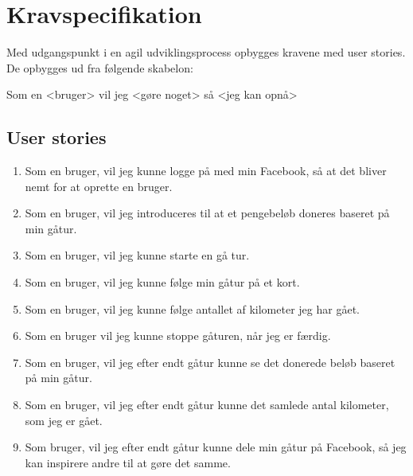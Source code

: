 \thispagestyle{fancy}
\chapter{Kravspecifikation}
\label{chp:description}

Med udgangspunkt i en agil udviklingsprocess opbygges kravene med user stories. De opbygges ud fra følgende skabelon: \\

\centerline{Som en <bruger> vil jeg <gøre noget> så <jeg kan opnå>}

\section{User stories}
\begin{enumerate}

\item Som en bruger, vil jeg kunne logge på med min Facebook, så at det bliver nemt for at oprette en bruger. 
\item Som en bruger, vil jeg introduceres til at et pengebeløb doneres baseret på min gåtur. 
\item Som en bruger, vil jeg kunne starte en gå tur.
\item Som en bruger, vil jeg kunne følge min gåtur på et kort. 
\item Som en bruger, vil jeg kunne følge antallet af kilometer jeg har gået. 
\item Som en bruger vil jeg kunne stoppe gåturen, når jeg er færdig. 
\item Som en bruger, vil jeg efter endt gåtur kunne se det donerede beløb baseret på min gåtur. 
\item Som en bruger, vil jeg efter endt gåtur kunne det samlede antal kilometer, som jeg er gået. 
\item Som bruger, vil jeg efter endt gåtur kunne dele min gåtur på Facebook, så jeg kan inspirere andre til at gøre det samme. 
\end{enumerate}